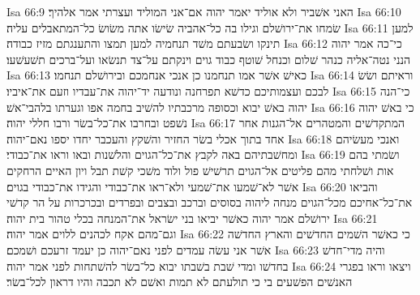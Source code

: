 Isa 66:9  האני אשׁביר ולא אוליד יאמר יהוה אם־אני המוליד ועצרתי אמר אלהיך׃
Isa 66:10  שׂמחו את־ירושׁלם וגילו בה כל־אהביה שׂישׂו אתה משׂושׂ כל־המתאבלים עליה׃
Isa 66:11  למען תינקו ושׂבעתם משׁד תנחמיה למען תמצו והתענגתם מזיז כבודה׃
Isa 66:12  כי־כה אמר יהוה הנני נטה־אליה כנהר שׁלום וכנחל שׁוטף כבוד גוים וינקתם על־צד תנשׂאו ועל־ברכים תשׁעשׁעו׃
Isa 66:13  כאישׁ אשׁר אמו תנחמנו כן אנכי אנחמכם ובירושׁלם תנחמו׃
Isa 66:14  וראיתם ושׂשׂ לבכם ועצמותיכם כדשׁא תפרחנה ונודעה יד־יהוה את־עבדיו וזעם את־איביו׃
Isa 66:15  כי־הנה יהוה באשׁ יבוא וכסופה מרכבתיו להשׁיב בחמה אפו וגערתו בלהבי־אשׁ׃
Isa 66:16  כי באשׁ יהוה נשׁפט ובחרבו את־כל־בשׂר ורבו חללי יהוה׃
Isa 66:17  המתקדשׁים והמטהרים אל־הגנות אחר אחד בתוך אכלי בשׂר החזיר והשׁקץ והעכבר יחדו יספו נאם־יהוה׃
Isa 66:18  ואנכי מעשׂיהם ומחשׁבתיהם באה לקבץ את־כל־הגוים והלשׁנות ובאו וראו את־כבודי׃
Isa 66:19  ושׂמתי בהם אות ושׁלחתי מהם פליטים אל־הגוים תרשׁישׁ פול ולוד משׁכי קשׁת תבל ויון האיים הרחקים אשׁר לא־שׁמעו את־שׁמעי ולא־ראו את־כבודי והגידו את־כבודי בגוים׃
Isa 66:20  והביאו את־כל־אחיכם מכל־הגוים מנחה ליהוה בסוסים וברכב ובצבים ובפרדים ובכרכרות על הר קדשׁי ירושׁלם אמר יהוה כאשׁר יביאו בני ישׂראל את־המנחה בכלי טהור בית יהוה׃
Isa 66:21  וגם־מהם אקח לכהנים ללוים אמר יהוה׃
Isa 66:22  כי כאשׁר השׁמים החדשׁים והארץ החדשׁה אשׁר אני עשׂה עמדים לפני נאם־יהוה כן יעמד זרעכם ושׁמכם׃
Isa 66:23  והיה מדי־חדשׁ בחדשׁו ומדי שׁבת בשׁבתו יבוא כל־בשׂר להשׁתחות לפני אמר יהוה׃
Isa 66:24  ויצאו וראו בפגרי האנשׁים הפשׁעים בי כי תולעתם לא תמות ואשׁם לא תכבה והיו דראון לכל־בשׂר׃


